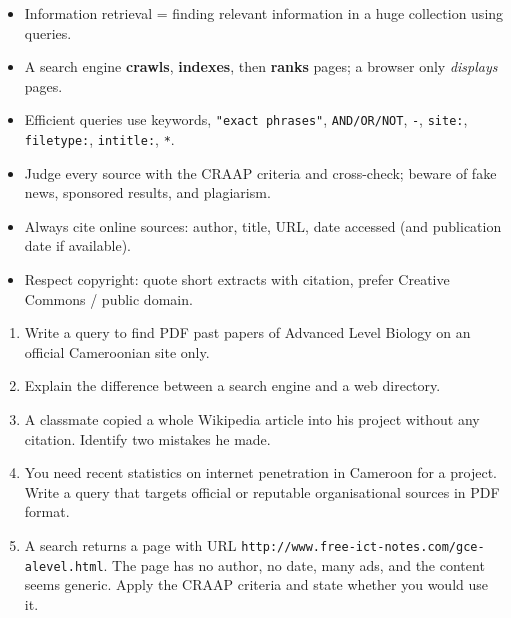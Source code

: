 \documentclass[11pt]{article}
\begin{document}
\begin{aretenir}
\begin{itemize}
\item Information retrieval = finding relevant information in a huge collection using queries.
\item A search engine \textbf{crawls}, \textbf{indexes}, then \textbf{ranks} pages; a browser only \emph{displays} pages.
\item Efficient queries use keywords, \texttt{"exact phrases"}, \texttt{AND/OR/NOT}, \texttt{-}, \texttt{site:}, \texttt{filetype:}, \texttt{intitle:}, \texttt{*}.
\item Judge every source with the CRAAP criteria and cross-check; beware of fake news, sponsored results, and plagiarism.
\item Always cite online sources: author, title, URL, date accessed (and publication date if available).
\item Respect copyright: quote short extracts with citation, prefer Creative Commons / public domain.
\end{itemize}
\end{aretenir}

\begin{exercice}
\begin{enumerate}
\item Write a query to find PDF past papers of Advanced Level Biology on an official Cameroonian site only.
\item Explain the difference between a search engine and a web directory.
\item A classmate copied a whole Wikipedia article into his project without any citation. Identify two mistakes he made.
\item You need recent statistics on internet penetration in Cameroon for a project. Write a query that targets official or reputable organisational sources in PDF format.
\item A search returns a page with URL \texttt{http://www.free-ict-notes.com/gce-alevel.html}. The page has no author, no date, many ads, and the content seems generic. Apply the CRAAP criteria and state whether you would use it.
\end{enumerate}
\end{exercice}
\end{document}
